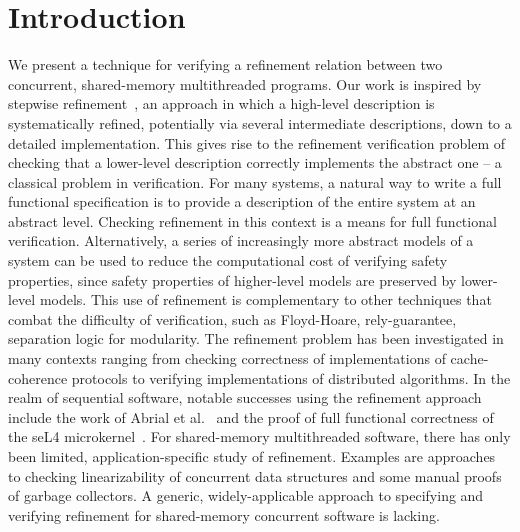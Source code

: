 \section{Introduction}
\label{sec:introduction}

We present a technique for verifying a refinement relation between two concurrent, shared-memory multithreaded programs. 
Our work is inspired by stepwise refinement~\cite{Wirth1971}, an approach in which a high-level description is systematically refined, 
potentially via several intermediate descriptions, down to a detailed implementation. 
This gives rise to the refinement verification problem of checking that a lower-level description correctly implements the abstract one -- a classical problem in verification.
For many systems, a natural way to write a full functional specification is to provide a description of the entire system at an abstract level. 
Checking refinement in this context is a means for full functional verification. 
Alternatively, a series of increasingly more abstract models of a system can be used to reduce the computational cost of verifying safety properties, since safety properties of higher-level models are preserved by lower-level models. 
This use of refinement is complementary to other techniques that combat the difficulty of verification, such as Floyd-Hoare, rely-guarantee, separation logic for modularity. 
The refinement problem has been investigated in many contexts ranging from checking correctness of implementations of cache-coherence protocols to verifying implementations of distributed algorithms. 
In the realm of sequential software, notable successes using the refinement approach include the work of Abrial et al.~\cite{AbrialBHHMV10} and the proof of full functional correctness of the seL4 microkernel~\cite{KleinAEMSKH14}. 
For shared-memory multithreaded software, there has only been limited, application-specific study of refinement. 
Examples are approaches to checking linearizability of concurrent data structures and some manual proofs of garbage collectors. 
A generic, widely-applicable approach to specifying and verifying refinement for shared-memory concurrent software is lacking. 


